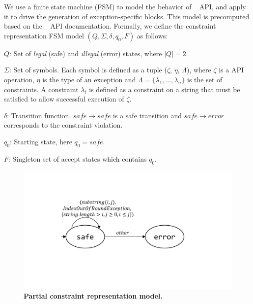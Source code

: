   We use a finite state machine
(FSM) to model the behavior of \java\  API, and apply it to drive
the generation of exception-specific  blocks. This model is
precomputed based on the \java\  API documentation. Formally, we
define the constraint representation FSM model $(Q, \Sigma, \delta, q_0, F)$ as
follows:
\begin{mybullet}
 \item $Q$: Set of \emph{legal} (safe) and \emph{illegal} (error) states, where
$|Q| = 2$. %

 \item $\Sigma$: Set of symbols. Each symbol is defined as a tuple ($\zeta$,
$\eta$, $\Lambda$), where $\zeta$ is a  API operation, $\eta$ is
the type of an exception and $\Lambda = \{\lambda_1, \ldots, \lambda_n\}$  is
the set of constraints. A constraint $\lambda_i$ is defined as a constraint on
a string that must be satisfied to allow successful execution of $\zeta$.

 \item $\delta$: Transition function. $safe \rightarrow safe$ is a safe
transition and $safe \rightarrow error$ corresponds to the constraint violation.

 \item $q_0$: Starting state, here $q_0 = safe$.

 \item $F$: Singleton set of accept states which contains $q_0$.
\end{mybullet}

\begin{figure}[t]
\centering
\includegraphics[scale=.28]{images/automataString.pdf}
\caption{\bf Partial constraint representation model.}
\label{fig:constraintautomata}
\end{figure}


